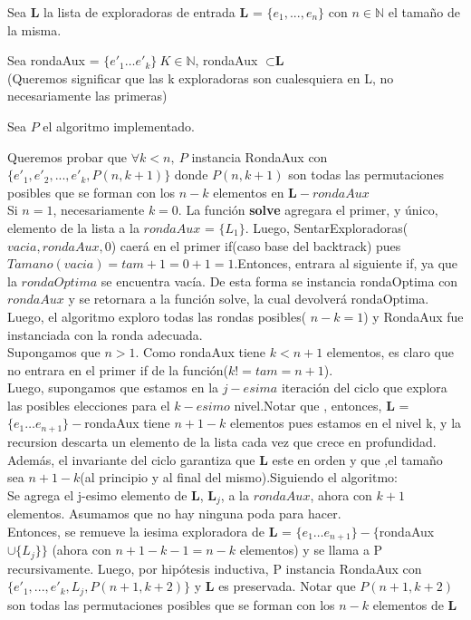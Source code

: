 \documentclass[10pt, a4paper]{article}
\begin{document}
Sea \textbf{L} la lista de exploradoras de entrada  \textbf{L} = $\{e_{1},...,e_{n}  \}$ con $n \in  \mathbb{N}$ el tamaño de la misma.

Sea   rondaAux = $\{ e'_{1}\ldots e'_{k} \} \   K \in  \mathbb{N} $,  rondaAux $\subset \textbf{L} $\\
(Queremos significar que las k exploradoras son cualesquiera en L, no necesariamente las primeras)

Sea $P$ el algoritmo implementado.

Queremos probar que $\forall k < n , \ P$  instancia RondaAux con $\{e'_{1},e'_{2},...,e'_{k},P(n,k+1)\}$ donde $P(n,k+1)$ son todas las permutaciones posibles que se forman con los $n - k$  elementos en $ \textbf{L} - rondaAux $\\


Si $n = 1$, necesariamente $k = 0$. La función \textbf{solve} agregara el primer, y único, elemento de la lista a la $rondaAux$ = $\{L_{1} \} $. Luego, SentarExploradoras($vacia,rondaAux,0$) caerá en el primer if(caso base del backtrack) pues $Tamano(vacia) = tam + 1 = 0 +1 = 1$.Entonces, entrara al siguiente if, ya que la $rondaOptima$ se encuentra vacía. De esta forma se instancia rondaOptima con $rondaAux$ y se retornara a la función solve, la cual devolverá rondaOptima. Luego, el algoritmo exploro todas las rondas posibles( $n - k = 1$) y RondaAux fue instanciada con la ronda adecuada.\\

Supongamos que $n> 1$. Como rondaAux tiene $k < n + 1$ elementos,  es claro que no entrara en el primer if de la función($ k != tam = n+1$).\\
Luego, supongamos que estamos en la $j-esima$ iteración del ciclo que explora las posibles elecciones para el $k-esimo$ nivel.Notar que , entonces, \textbf{L} = $\{e_{1} \ldots e_{n+1}\} - $rondaAux  tiene $n+1-k$ elementos pues estamos en el nivel k, y  la recursion descarta un elemento de la lista cada vez que crece en profundidad. Además, el invariante del ciclo garantiza que  \textbf{L} este en orden y que ,el tamaño sea $n+1-k$(al principio y al final del mismo).Siguiendo el algoritmo: \\

Se agrega el j-esimo elemento de \textbf{L}, \textbf{L}$_{j}$, a la $rondaAux$, ahora con $k+1$ elementos. Asumamos que no hay ninguna poda para hacer.\\

Entonces, se remueve la iesima exploradora de \textbf{L} =  $\{e_{1} \ldots e_{n+1}\} - \{$rondaAux $\cup \{L_{j} \} \}$ (ahora con $n + 1 -k -1 = n - k$ elementos) y se llama a P recursivamente. Luego, por hipótesis inductiva, P instancia RondaAux con $\{e'_{1},..., e'_{k},L_{j},P(n+1,k+2)\}$ y \textbf{L} es preservada. Notar que $P(n+1,k+2)$  son todas las permutaciones posibles que se forman con los $n-k$ elementos de  \textbf{L} \\
\end{document}
